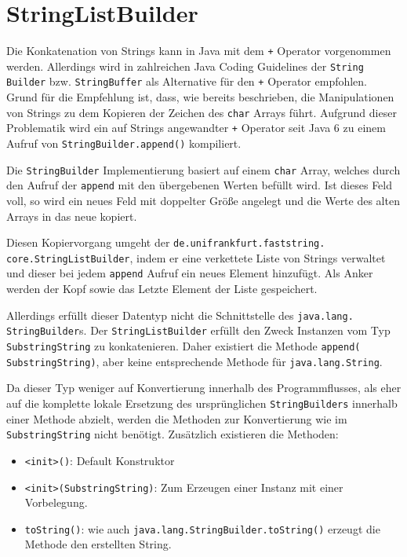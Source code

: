 \section{StringListBuilder} 

Die Konkatenation von Strings kann in Java mit dem \texttt{+} Operator vorgenommen werden. Allerdings 
wird in zahlreichen Java Coding Guidelines der \texttt{String\\Builder} bzw. \texttt{StringBuffer}
als Alternative für den \texttt{+} Operator empfohlen. Grund für die Empfehlung ist,
dass, wie bereits beschrieben, die Manipulationen von Strings zu dem Kopieren der 
Zeichen des \texttt{char} Arrays führt. Aufgrund dieser Problematik wird ein auf Strings 
angewandter \texttt{+} Operator seit Java 6 zu einem Aufruf von \texttt{StringBuilder.append()} 
kompiliert.  

Die \texttt{StringBuilder} Implementierung basiert auf einem \texttt{char} Array, welches
durch den Aufruf der \texttt{append} mit den übergebenen Werten befüllt wird. Ist dieses Feld voll,
so wird ein neues Feld mit doppelter Größe angelegt und die Werte des alten Arrays in das 
neue kopiert.

Diesen Kopiervorgang umgeht der \texttt{de.unifrankfurt.faststring.\\core.StringListBuilder}, 
indem er eine verkettete Liste von Strings verwaltet und dieser bei jedem \texttt{append} Aufruf 
ein neues Element hinzufügt. Als Anker werden der Kopf sowie das Letzte Element der Liste gespeichert.

Allerdings erfüllt dieser Datentyp nicht die Schnittstelle des \texttt{java.lang.\\StringBuilder}s.
Der \texttt{StringListBuilder} erfüllt den Zweck Instanzen vom Typ \texttt{SubstringString} 
zu konkatenieren. Daher existiert die Methode \texttt{append(\\SubstringString)}, aber keine entsprechende
Methode für \texttt{java.lang.String}.

Da dieser Typ weniger auf Konvertierung innerhalb des Programmflusses, als eher auf die komplette
lokale Ersetzung des ursprünglichen \texttt{StringBuilders} innerhalb einer Methode abzielt, 
werden die Methoden zur Konvertierung wie im \texttt{SubstringString} nicht benötigt. Zusätzlich 
existieren die Methoden:

\begin{itemize}
	\item \texttt{<init>()}: Default Konstruktor
	\item \texttt{<init>(SubstringString)}: Zum Erzeugen einer Instanz mit einer Vorbelegung.
	\item \texttt{toString()}: wie auch \texttt{java.lang.StringBuilder.toString()} erzeugt die Methode 
	den erstellten String.
\end{itemize}
